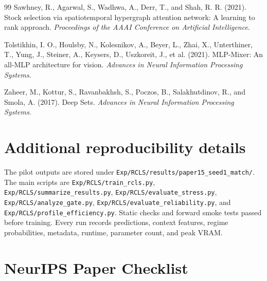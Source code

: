 \documentclass{article}
\begin{document}
\begin{thebibliography}{99}
Sawhney, R., Agarwal, S., Wadhwa, A., Derr, T., and Shah, R. R. (2021).
Stock selection via spatiotemporal hypergraph attention network: A learning to rank approach.
\emph{Proceedings of the AAAI Conference on Artificial Intelligence}.

Tolstikhin, I. O., Houlsby, N., Kolesnikov, A., Beyer, L., Zhai, X., Unterthiner, T., Yung, J., Steiner, A., Keysers, D., Uszkoreit, J., et al. (2021).
MLP-Mixer: An all-MLP architecture for vision.
\emph{Advances in Neural Information Processing Systems}.

Zaheer, M., Kottur, S., Ravanbakhsh, S., Poczos, B., Salakhutdinov, R., and Smola, A. (2017).
Deep Sets.
\emph{Advances in Neural Information Processing Systems}.

\end{thebibliography}

\appendix

\section{Additional reproducibility details}

The pilot outputs are stored under \texttt{Exp/RCLS/results/paper15\_seed1\_match/}. The main scripts are \texttt{Exp/RCLS/train\_rcls.py}, \texttt{Exp/RCLS/summarize\_results.py}, \texttt{Exp/RCLS/evaluate\_stress.py}, \texttt{Exp/RCLS/analyze\_gate.py}, \texttt{Exp/RCLS/evaluate\_reliability.py}, and \texttt{Exp/RCLS/profile\_efficiency.py}. Static checks and forward smoke tests passed before training. Every run records predictions, context features, regime probabilities, metadata, runtime, parameter count, and peak VRAM.

\section*{NeurIPS Paper Checklist}
\end{document}
